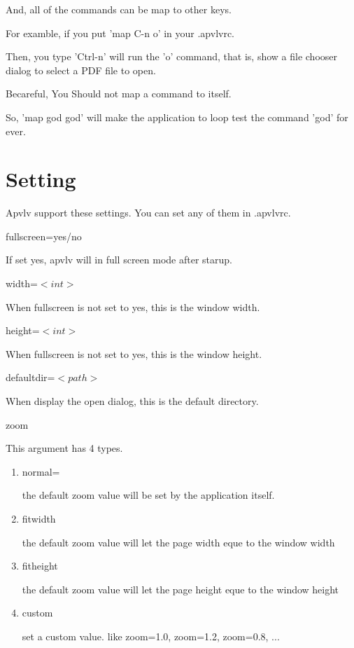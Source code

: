 \documentclass[a4paper,12pt]{article}
\begin{document}
And, all of the commands can be map to other keys.

For examble, if you put 
'map C-n o'
in your .apvlvrc.

Then, you type 'Ctrl-n' will run the 'o' command, that is, show a file chooser dialog to select a PDF file to open.

Becareful, You Should not map a command to itself.

So, 'map god god' will make the application to loop test the command 'god' for ever.

\newpage

\section{Setting}

Apvlv support these settings. You can set any of them in .apvlvrc.

\begin{description}

\item fullscreen=yes/no

If set yes, apvlv will in full screen mode after starup.

\item width=$<int>$

When fullscreen is not set to yes, this is the window width.

\item height=$<int>$

When fullscreen is not set to yes, this is the window height.

\item defaultdir=$<path>$

When display the open dialog, this is the default directory.

\item zoom

This argument has 4 types.

\begin{enumerate}

\item normal=

the default zoom value will be set by the application itself.

\item fitwidth

the default zoom value will let the page width eque to the window width

\item fitheight

the default zoom value will let the page height eque to the window height

\item custom

set a custom value. like zoom=1.0, zoom=1.2, zoom=0.8, ...

\end{enumerate}

\end{description}
\end{document}
